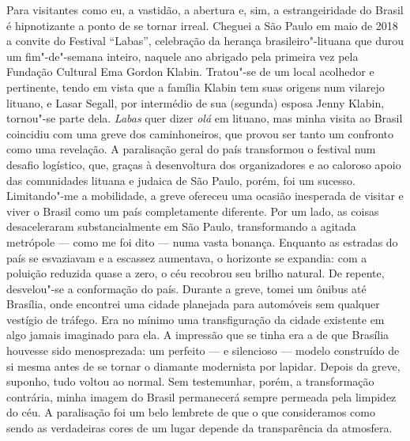 {Para visitantes como eu, a vastidão, a abertura e, sim, a
estrangeiridade do Brasil é hipnotizante a ponto de se tornar irreal.
Cheguei a São Paulo em maio de 2018 a convite do Festival ``Labas'',
celebração da herança brasileiro"-lituana que durou um fim"-de"-semana
inteiro, naquele ano abrigado pela primeira vez pela Fundação Cultural
Ema Gordon Klabin. Tratou"-se de um local acolhedor e pertinente, tendo
em vista que a família Klabin tem suas origens num vilarejo lituano, e
Lasar Segall, por intermédio de sua (segunda) esposa Jenny Klabin,
tornou"-se parte dela. \textit{Labas} quer dizer \textit{olá} em lituano, mas
minha visita ao Brasil coincidiu com uma greve dos caminhoneiros, que
provou ser tanto um confronto como uma revelação. A paralisação geral do
país transformou o festival num desafio logístico, que, graças à
desenvoltura dos organizadores e ao caloroso apoio das comunidades
lituana e judaica de São Paulo, porém, foi um sucesso. Limitando"-me a
mobilidade, a greve ofereceu uma ocasião inesperada de visitar e viver o
Brasil como um país completamente diferente. Por um lado, as coisas
desaceleraram substancialmente em São Paulo, transformando a agitada
metrópole --- como me foi dito --- numa vasta bonança. Enquanto as estradas
do país se esvaziavam e a escassez aumentava, o horizonte se expandia:
com a poluição reduzida quase a zero, o céu recobrou seu brilho natural.
De repente, desvelou"-se a conformação do país. Durante a greve, tomei um
ônibus até Brasília, onde encontrei uma cidade planejada para automóveis
sem qualquer vestígio de tráfego. Era no mínimo uma transfiguração da
cidade existente em algo jamais imaginado para ela. A impressão que se
tinha era a de que Brasília houvesse sido menosprezada: um perfeito --- e
silencioso --- modelo construído de si mesma antes de se tornar o diamante
modernista por lapidar. Depois da greve, suponho, tudo voltou ao normal.
Sem testemunhar, porém, a transformação contrária, minha imagem do
Brasil permanecerá sempre permeada pela limpidez do céu. A paralisação
foi um belo lembrete de que o que consideramos como sendo as verdadeiras
cores de um lugar depende da transparência da atmosfera.

}
